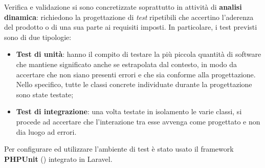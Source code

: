 Verifica e validazione si sono concretizzate soprattutto in attività di \textbf{analisi dinamica}: richiedono la progettazione di \textit{test} ripetibili che accertino l'aderenza del prodotto o di una sua parte ai requisiti imposti. In particolare, i test previsti sono di due tipologie:

\begin{itemize}
	\item \textbf{Test di unità}: hanno il compito di testare la più piccola quantità di software che mantiene significato anche se estrapolata dal contesto, in modo da accertare che non siano presenti errori e che sia conforme alla progettazione. Nello specifico, tutte le classi concrete individuate durante la progettazione sono state testate;
	\item \textbf{Test di integrazione}: una volta testate in isolamento le varie classi, si procede ad accertare che l'interazione tra esse avvenga come progettato e non dia luogo ad errori.
\end{itemize}

Per configurare ed utilizzare l'ambiente di test è stato usato il framework \textbf{PHPUnit} (\cite{site:phpunit-doc}) integrato in Laravel.

